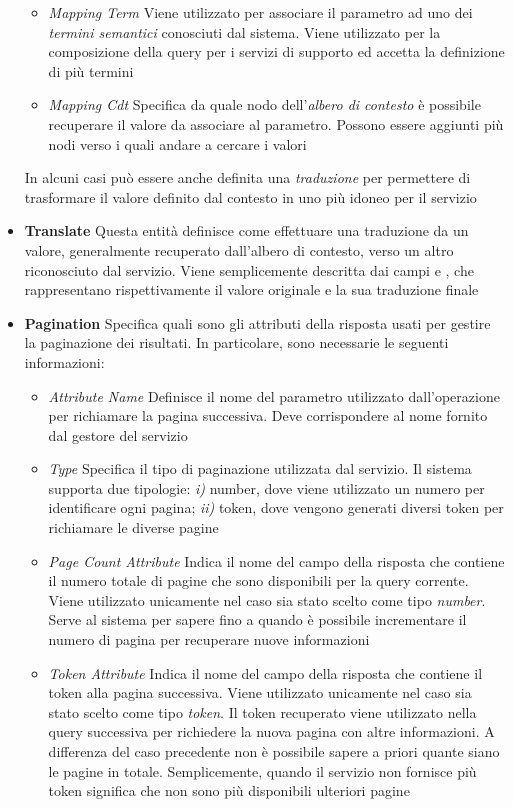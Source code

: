 \begin{itemize}
\begin{itemize}
		\item \emph{Mapping Term} Viene utilizzato per associare il parametro ad uno dei \emph{termini semantici} conosciuti dal sistema. Viene utilizzato per la composizione della query per i servizi di supporto ed accetta la definizione di più termini
		\item \emph{Mapping Cdt} Specifica da quale nodo dell'\emph{albero di contesto} è possibile recuperare il valore da associare al parametro. Possono essere aggiunti più nodi verso i quali andare a cercare i valori
	\end{itemize}
	In alcuni casi può essere anche definita una \emph{traduzione} per permettere di trasformare il valore definito dal contesto in uno più idoneo per il servizio
	\item \textbf{Translate} Questa entità definisce come effettuare una traduzione da un valore, generalmente recuperato dall'albero di contesto, verso un altro riconosciuto dal servizio. Viene semplicemente descritta dai campi  e , che rappresentano rispettivamente il valore originale e la sua traduzione finale
	\item \textbf{Pagination} Specifica quali sono gli attributi della risposta usati per gestire la paginazione dei risultati. In particolare, sono necessarie le seguenti informazioni:
	\begin{itemize}
		\item \emph{Attribute Name} Definisce il nome del parametro utilizzato dall'operazione per richiamare la pagina successiva. Deve corrispondere al nome fornito dal gestore del servizio
		\item \emph{Type} Specifica il tipo di paginazione utilizzata dal servizio. Il sistema supporta due tipologie: \emph{i)} number, dove viene utilizzato un numero per identificare ogni pagina; \emph{ii)} token, dove vengono generati diversi token per richiamare le diverse pagine
		\item \emph{Page Count Attribute} Indica il nome del campo della risposta che contiene il numero totale di pagine che sono disponibili per la query corrente. Viene utilizzato unicamente nel caso sia stato scelto come tipo \emph{number}. Serve al sistema per sapere fino a quando è possibile incrementare il numero di pagina per recuperare nuove informazioni
		\item \emph{Token Attribute} Indica il nome del campo della risposta che contiene il token alla pagina successiva. Viene utilizzato unicamente nel caso sia stato scelto come tipo \emph{token}. Il token recuperato viene utilizzato nella query successiva per richiedere la nuova pagina con altre informazioni. A differenza del caso precedente non è possibile sapere a priori quante siano le pagine in totale. Semplicemente, quando il servizio non fornisce più token significa che non sono più disponibili ulteriori pagine

\end{itemize}
\end{itemize}
